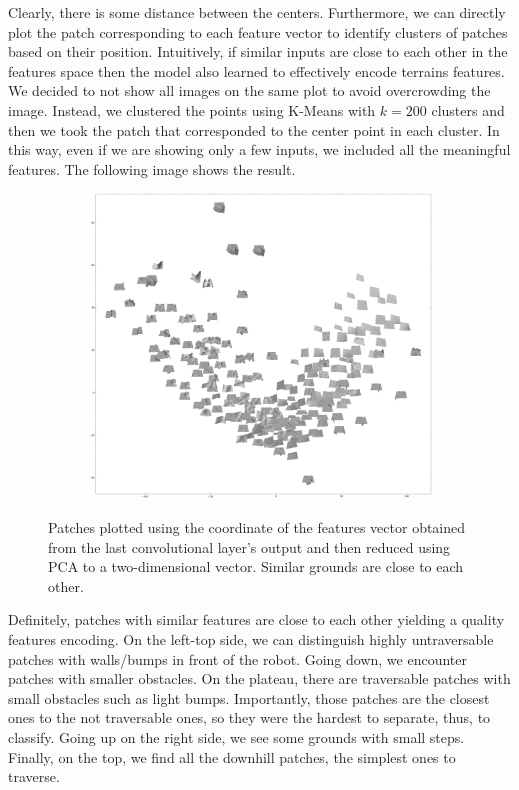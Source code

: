 \documentclass[../document.tex]{subfiles}
\begin{document}
Clearly, there is some distance between the centers. Furthermore, we can directly plot the patch corresponding to each feature vector to identify clusters of patches based on their position. Intuitively, if similar inputs are close to each other in the features space then the model also learned to effectively encode terrains features.   We decided to not show all images on the same plot to avoid overcrowding the image. Instead, we clustered the points using K-Means with $k=200$ clusters and then we took the patch that corresponded to the center point in each cluster. In this way, even if we are showing only a few inputs, we included all the meaningful features. The following image shows the result. 
\begin{figure} [htbp]
    \centering
    \begin{subfigure}[b]{1\textwidth}
        \includegraphics[width=\linewidth]{../img/5/pca/pca-patches-200.png}
    \end{subfigure}
    \caption{Patches plotted using the coordinate of the features vector obtained from the last convolutional layer's output and then reduced using PCA to a two-dimensional vector. Similar grounds are close to each other.}
\end{figure}
Definitely, patches with similar features are close to each other yielding a quality features encoding. On the left-top side, we can distinguish highly untraversable patches with walls/bumps in front of the robot. Going down, we encounter patches with smaller obstacles. On the plateau, there are traversable patches with small obstacles such as light bumps. Importantly,  those patches are the closest ones to the not traversable ones, so they were the hardest to separate, thus, to classify.  Going up on the right side, we see some grounds with small steps. Finally, on the top, we find all the downhill patches, the simplest ones to traverse.
\end{document}

